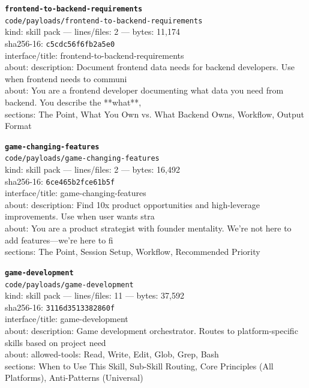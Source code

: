 \noindent\textbf{\texttt{frontend-to-backend-requirements}}\\
\texttt{code/payloads/frontend-to-backend-requirements}\\
kind: skill pack --- lines/files: 2 --- bytes: 11,174\\
sha256-16: \texttt{c5cdc56f6fb2a5e0}\\
interface/title: frontend-to-backend-requirements\\
about: description: Document frontend data needs for backend developers. Use when frontend needs to communi\\
about: You are a frontend developer documenting what data you need from backend. You describe the **what**,\\
sections: The Point, What You Own vs. What Backend Owns, Workflow, Output Format\\
\vspace*{6.0pt}

\noindent\textbf{\texttt{game-changing-features}}\\
\texttt{code/payloads/game-changing-features}\\
kind: skill pack --- lines/files: 2 --- bytes: 16,492\\
sha256-16: \texttt{6ce465b2fce61b5f}\\
interface/title: game-changing-features\\
about: description: Find 10x product opportunities and high-leverage improvements. Use when user wants stra\\
about: You are a product strategist with founder mentality. We're not here to add features—we're here to fi\\
sections: The Point, Session Setup, Workflow, Recommended Priority\\
\vspace*{6.0pt}
\newpage

\noindent\textbf{\texttt{game-development}}\\
\texttt{code/payloads/game-development}\\
kind: skill pack --- lines/files: 11 --- bytes: 37,592\\
sha256-16: \texttt{3116d3513382860f}\\
interface/title: game-development\\
about: description: Game development orchestrator. Routes to platform-specific skills based on project need\\
about: allowed-tools: Read, Write, Edit, Glob, Grep, Bash\\
sections: When to Use This Skill, Sub-Skill Routing, Core Principles (All Platforms), Anti-Patterns (Universal)\\
\vspace*{6.0pt}

